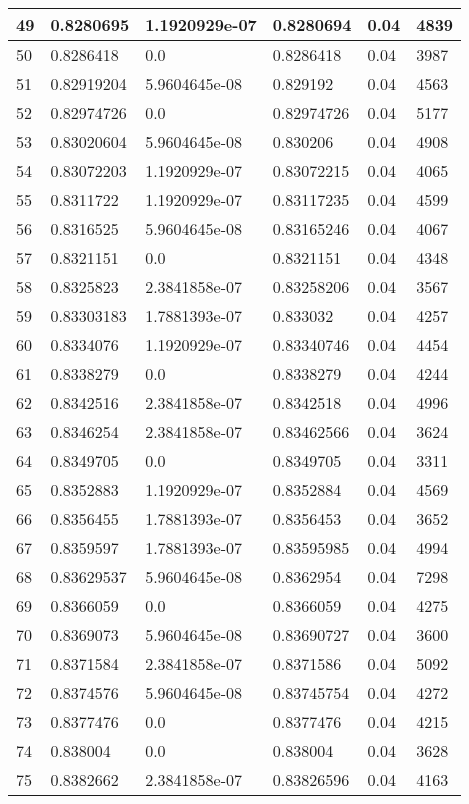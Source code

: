 \begin{longtable}{|l|l|l|l|l|l|}
49 & 0.8280695 & 1.1920929e-07 & 0.8280694 & 0.04 & 4839 \\ \hline 
50 & 0.8286418 & 0.0 & 0.8286418 & 0.04 & 3987 \\ \hline 
51 & 0.82919204 & 5.9604645e-08 & 0.829192 & 0.04 & 4563 \\ \hline 
52 & 0.82974726 & 0.0 & 0.82974726 & 0.04 & 5177 \\ \hline 
53 & 0.83020604 & 5.9604645e-08 & 0.830206 & 0.04 & 4908 \\ \hline 
54 & 0.83072203 & 1.1920929e-07 & 0.83072215 & 0.04 & 4065 \\ \hline 
55 & 0.8311722 & 1.1920929e-07 & 0.83117235 & 0.04 & 4599 \\ \hline 
56 & 0.8316525 & 5.9604645e-08 & 0.83165246 & 0.04 & 4067 \\ \hline 
57 & 0.8321151 & 0.0 & 0.8321151 & 0.04 & 4348 \\ \hline 
58 & 0.8325823 & 2.3841858e-07 & 0.83258206 & 0.04 & 3567 \\ \hline 
59 & 0.83303183 & 1.7881393e-07 & 0.833032 & 0.04 & 4257 \\ \hline 
60 & 0.8334076 & 1.1920929e-07 & 0.83340746 & 0.04 & 4454 \\ \hline 
61 & 0.8338279 & 0.0 & 0.8338279 & 0.04 & 4244 \\ \hline 
62 & 0.8342516 & 2.3841858e-07 & 0.8342518 & 0.04 & 4996 \\ \hline 
63 & 0.8346254 & 2.3841858e-07 & 0.83462566 & 0.04 & 3624 \\ \hline 
64 & 0.8349705 & 0.0 & 0.8349705 & 0.04 & 3311 \\ \hline 
65 & 0.8352883 & 1.1920929e-07 & 0.8352884 & 0.04 & 4569 \\ \hline 
66 & 0.8356455 & 1.7881393e-07 & 0.8356453 & 0.04 & 3652 \\ \hline 
67 & 0.8359597 & 1.7881393e-07 & 0.83595985 & 0.04 & 4994 \\ \hline 
68 & 0.83629537 & 5.9604645e-08 & 0.8362954 & 0.04 & 7298 \\ \hline 
69 & 0.8366059 & 0.0 & 0.8366059 & 0.04 & 4275 \\ \hline 
70 & 0.8369073 & 5.9604645e-08 & 0.83690727 & 0.04 & 3600 \\ \hline 
71 & 0.8371584 & 2.3841858e-07 & 0.8371586 & 0.04 & 5092 \\ \hline 
72 & 0.8374576 & 5.9604645e-08 & 0.83745754 & 0.04 & 4272 \\ \hline 
73 & 0.8377476 & 0.0 & 0.8377476 & 0.04 & 4215 \\ \hline 
74 & 0.838004 & 0.0 & 0.838004 & 0.04 & 3628 \\ \hline 
75 & 0.8382662 & 2.3841858e-07 & 0.83826596 & 0.04 & 4163 \\ \hline 
\end{longtable}